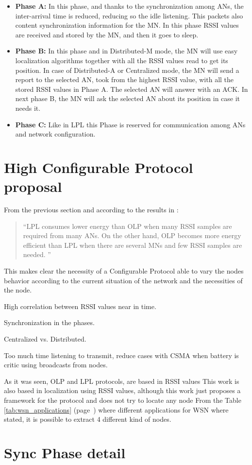 \begin{itemize}
 \item \textbf{Phase A:} In this phase, and thanks to the synchronization among \acp{AN}, the inter-arrival time is reduced, reducing so the
idle listening. This packets also content synchronization information for the \ac{MN}. In this phase \ac{RSSI} values are received and stored
by the \ac{MN}, and then it goes to sleep.
 \item \textbf{Phase B:} In this phase and in Distributed-M mode, the \ac{MN} will use easy localization algorithms together with all the \ac{RSSI}
values read to get its position. In case of Distributed-A or Centralized mode, the \ac{MN} will send a report to the selected \ac{AN}, took 
from the highest \ac{RSSI} value, with all the stored \ac{RSSI} values in Phase A. The selected \ac{AN} will answer with an \ac{ACK}. In next
phase B, the \ac{MN} will ask the selected \ac{AN} about its position in case it needs it.
 \item \textbf{Phase C:} Like in \ac{LPL} this Phase is reserved for communication among \acp{AN} and network configuration.
\end{itemize}


\section{High Configurable Protocol proposal}

From the previous section and according to the results in \cite{LPLandOLP}:
\begin{quote}
``LPL consumes lower energy than OLP when many RSSI samples are required from many ANs. On the other hand,
OLP becomes more energy efficient than LPL when there are several MNs and few RSSI samples are needed. \cite{LPLandOLP}''
\end{quote}

This makes clear the necessity of a Configurable Protocol able to vary the nodes behavior according to the current situation of the network
and the necessities of the node.

High correlation between RSSI values near in time.

Synchronization in the phases.

Centralized vs. Distributed.

Too much time listening to transmit, reduce cases with CSMA when battery is critic using broadcasts from nodes.

As it was seen, \ac{OLP} and \ac{LPL} protocols, are based in \ac{RSSI} values
This work is also based in localization using \ac{RSSI} values, although this work just proposes a framework for the protocol and does not try 
to locate any
node 
From the Table \ref{tab:wsn_applications} (page~\pageref{tab:wsn_applications}) where different applications for \ac{WSN} where stated, it is possible
to extract 4 different kind of nodes.

\section{Sync Phase detail}
